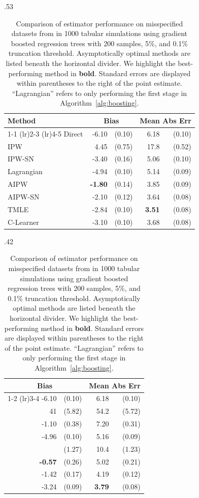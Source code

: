 \begin{table}[H]
\footnotesize
\centering
\hfill
\begin{subtable}{.53\linewidth}
\centering
\caption{$N=200$, truncation threshold = 5\%} %
\begin{tabular}{lrrrr}
\toprule
 Method & \multicolumn{2}{c}{Bias} & \multicolumn{2}{c}{Mean Abs Err} \\
\cmidrule(lr){1-1}
\cmidrule(lr){2-3}
\cmidrule(lr){4-5}
Direct & -6.10 & (0.10) & 6.18 & (0.10)\\
IPW & 4.45 & (0.75) & 17.8 & (0.52) \\
IPW-SN & -3.40 & (0.16) & 5.06 & (0.10)\\
Lagrangian & -4.94 & (0.10) & 5.14 & (0.09) \\
\greymidrule
AIPW & \textbf{-1.80} & (0.14) & 3.85 & (0.09) \\
AIPW-SN & -2.10 & (0.12) & 3.64 & (0.08) \\
TMLE & -2.84 & (0.10) & \textbf{3.51} & (0.08) \\
C-Learner & -3.10 & (0.10) & 3.68 & (0.08) \\
\bottomrule
\end{tabular}
\end{subtable}
\hspace{-3.15em}
\begin{subtable}{.42\linewidth}
\centering
\caption{$N=200$, truncation threshold = 0.1\%} %
\begin{tabular}{rrrr}
\toprule
 \multicolumn{2}{c}{Bias} & \multicolumn{2}{c}{Mean Abs Err} \\
\cmidrule(lr){1-2}
\cmidrule(lr){3-4}
-6.10 & (0.10) & 6.18 & (0.10)\\
41 & (5.82) & 54.2 & (5.72) \\
-1.10 & (0.38) & 7.20 & (0.31)\\
-4.96 & (0.10) & 5.16 & (0.09) \\
\greymidrule
4.82 & (1.27) & 10.4 & (1.23) \\
\textbf{-0.57} & (0.26) & 5.02 & (0.21) \\
-1.42 & (0.17) & 4.19 & (0.12) \\
-3.24 & (0.09) & \textbf{3.79} & (0.08) \\
\bottomrule
\end{tabular}
\end{subtable}
\hfill
\hspace*{\fill}
\caption{Comparison of estimator performance on misspecified datasets from \citet{KangSc07} in 1000 tabular simulations using gradient boosted regression trees with 200 samples, 5\%, and 0.1\% truncation threshold. Asymptotically optimal methods are listed beneath the horizontal divider. We highlight the best-performing method in \textbf{bold}. Standard errors are displayed within parentheses to the right of the point estimate. ``Lagrangian'' refers to only performing the first stage in Algorithm~\ref{alg:boosting}.
}

    \label{tb:linear_simulation_xgb_trim}
\end{table}





